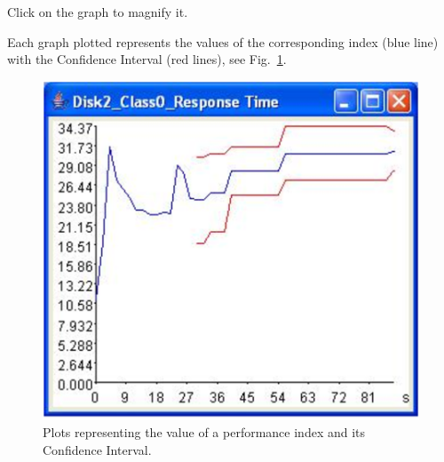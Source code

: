 Click on the graph to magnify it.

Each graph plotted represents the values of the corresponding
index (blue line) with the Confidence Interval (red lines), see
Fig.~\ref{fig:valconfint}.
\begin{figure}[htb]
    \begin{center}
        \includegraphics[scale=.5]{img/jsimg/11.2.eps}
    \end{center}
    \caption{Plots representing the value of a performance index and its
    Confidence Interval.}
    \label{fig:valconfint}
\end{figure}\\

